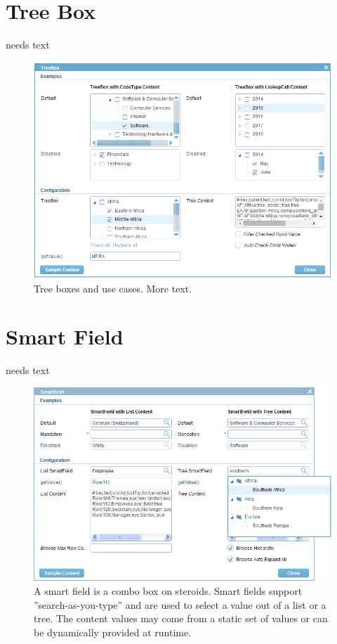 \documentclass[a4paper,10pt,twoside]{book}
\begin{document}
{%
\section{Tree Box}
needs text

\begin{figure}
\includegraphics[width=14cm]{treebox.png}
\caption{Tree boxes and use cases.
More text.}
\end{figure}

\section{Smart Field}
needs text

\begin{figure}
\includegraphics[width=14cm]{smartfield.png}
\caption{A smart field is a combo box on steroids.
Smart fields support ''search-as-you-type'' and are used to select a value out of a list or a tree.
The content values may come from a static set of values or can be dynamically provided at runtime.}
\end{figure}

}
\end{document}
